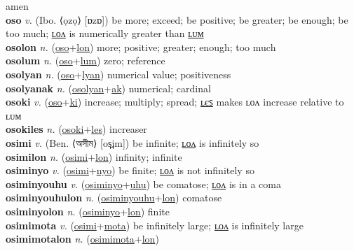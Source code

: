 amen \label{'omeyn} \\
\textbf{oso} \textit{v.} (Ibo. ⟨ọzọ⟩ [ɒzɒ])
be more; exceed; be positive; be greater; be enough; be too much; \hyperref[osolon]{ʟᴏᴧ} is numerically greater than \hyperref[osolum]{ʟᴜᴍ} \label{oso} \\
\textbf{osolon} \textit{n.} (\hyperref[oso]{oso}+\hyperref[lon]{lon})
more; positive; greater; enough; too much \label{osolon} \\
\textbf{osolum} \textit{n.} (\hyperref[oso]{oso}+\hyperref[lum]{lum})
zero; reference \label{osolum} \\
\textbf{osolyan} \textit{n.} (\hyperref[oso]{oso}+\hyperref[lyan]{lyan})
numerical value; positiveness \label{osolyan} \\
\textbf{osolyanak} \textit{n.} (\hyperref[osolyan]{osolyan}+\hyperref[ak]{ak})
numerical; cardinal \label{osolyanak} \\
\textbf{osoki} \textit{v.} (\hyperref[oso]{oso}+\hyperref[ki]{ki})
increase; multiply; spread; \hyperref[osokiles]{ʟєꜱ} makes ʟᴏᴧ increase relative to ʟᴜᴍ \label{osoki} \\
\textbf{osokiles} \textit{n.} (\hyperref[osoki]{osoki}+\hyperref[les]{les})
increaser \label{osokiles} \\
\textbf{osimi} \textit{v.} (Ben. ⟨অসীম⟩ [os̪im])
be infinite; \hyperref[osimilon]{ʟᴏᴧ} is infinitely so \label{osimi} \\
\textbf{osimilon} \textit{n.} (\hyperref[osimi]{osimi}+\hyperref[lon]{lon})
infinity; infinite \label{osimilon} \\
\textbf{osiminyo} \textit{v.} (\hyperref[osimi]{osimi}+\hyperref[nyo]{nyo})
be finite; \hyperref[osiminyolon]{ʟᴏᴧ} is not infinitely so \label{osiminyo} \\
\textbf{osiminyouhu} \textit{v.} (\hyperref[osiminyo]{osiminyo}+\hyperref[uhu]{uhu})
be comatose; \hyperref[osiminyouhulon]{ʟᴏᴧ} is in a coma \label{osiminyouhu} \\
\textbf{osiminyouhulon} \textit{n.} (\hyperref[osiminyouhu]{osiminyouhu}+\hyperref[lon]{lon})
comatose \label{osiminyouhulon} \\
\textbf{osiminyolon} \textit{n.} (\hyperref[osiminyo]{osiminyo}+\hyperref[lon]{lon})
finite \label{osiminyolon} \\
\textbf{osimimota} \textit{v.} (\hyperref[osimi]{osimi}+\hyperref[mota]{mota})
be infinitely large; \hyperref[osimimotalon]{ʟᴏᴧ} is infinitely large \label{osimimota} \\
\textbf{osimimotalon} \textit{n.} (\hyperref[osimimota]{osimimota}+\hyperref[lon]{lon})
